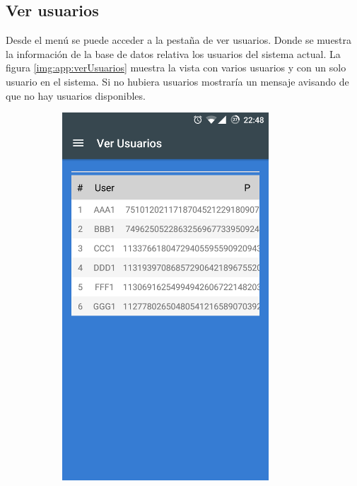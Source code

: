 \documentclass[../PFC.tex]{subfiles}
\begin{document}
\subsection{Ver usuarios}
\label{App:AD:Ver usuarios}

Desde el menú se puede acceder a la pestaña de ver usuarios. Donde se muestra la información de la base de datos relativa  los usuarios del sistema actual. La figura \ref{img:app:verUsuarios} muestra la vista con varios usuarios y con un solo usuario en el sistema. Si no hubiera usuarios mostraría un mensaje avisando de que no hay usuarios disponibles.

\begin{figure}[H]
\centering
	\begin{subfigure}{0.4\textwidth}
		\centering
		\includegraphics[width=0.85\textwidth]{./img/app/verUsuarios}

\end{subfigure}
\end{figure}
\end{document}
